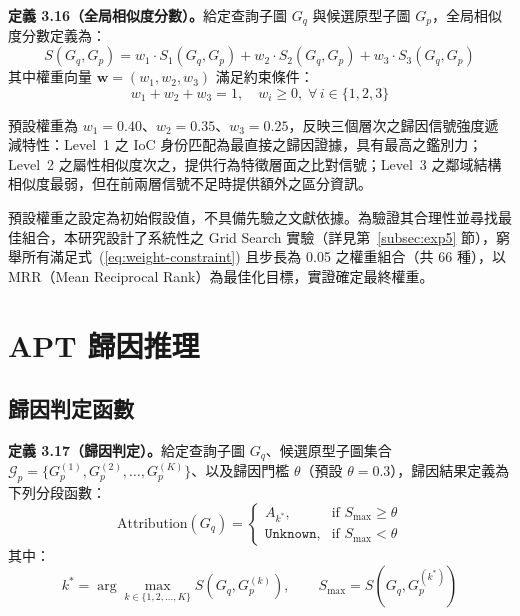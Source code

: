 \begin{ZhChapter}
\noindent\textbf{定義 3.16（全局相似度分數）。}給定查詢子圖 $G_q$ 與候選原型子圖 $G_p$，全局相似度分數定義為：
\begin{equation}
    S(G_q, G_p) = w_1 \cdot S_1(G_q, G_p) + w_2 \cdot S_2(G_q, G_p) + w_3 \cdot S_3(G_q, G_p)
    \label{eq:global-score}
\end{equation}
其中權重向量 $\mathbf{w} = (w_1, w_2, w_3)$ 滿足約束條件：
\begin{equation}
    w_1 + w_2 + w_3 = 1, \quad w_i \geq 0,\; \forall\, i \in \{1, 2, 3\}
    \label{eq:weight-constraint}
\end{equation}

預設權重為 $w_1 = 0.40$、$w_2 = 0.35$、$w_3 = 0.25$，反映三個層次之歸因信號強度遞減特性：Level~1 之 IoC 身份匹配為最直接之歸因證據，具有最高之鑑別力；Level~2 之屬性相似度次之，提供行為特徵層面之比對信號；Level~3 之鄰域結構相似度最弱，但在前兩層信號不足時提供額外之區分資訊。

預設權重之設定為初始假設值，不具備先驗之文獻依據。為驗證其合理性並尋找最佳組合，本研究設計了系統性之 Grid Search 實驗（詳見第~\ref{subsec:exp5} 節），窮舉所有滿足式~(\ref{eq:weight-constraint}) 且步長為 0.05 之權重組合（共 66 種），以 MRR（Mean Reciprocal Rank）為最佳化目標，實證確定最終權重。


\section{APT 歸因推理}
\label{sec:attribution}

\subsection{歸因判定函數}
\label{subsec:attribution-function}

\noindent\textbf{定義 3.17（歸因判定）。}給定查詢子圖 $G_q$、候選原型子圖集合 $\mathcal{G}_p = \{G_p^{(1)}, G_p^{(2)}, \ldots, G_p^{(K)}\}$、以及歸因門檻 $\theta$（預設 $\theta = 0.3$），歸因結果定義為下列分段函數：
\begin{equation}
    \text{Attribution}(G_q) = \begin{cases} A_{k^*}, & \text{if } S_{\max} \geq \theta \\[4pt] \texttt{Unknown}, & \text{if } S_{\max} < \theta \end{cases}
    \label{eq:attribution}
\end{equation}
其中：
\begin{equation}
    k^* = \arg\max_{k \in \{1, 2, \ldots, K\}} S(G_q, G_p^{(k)}), \qquad S_{\max} = S(G_q, G_p^{(k^*)})
    \label{eq:best-match}
\end{equation}


\end{ZhChapter}
